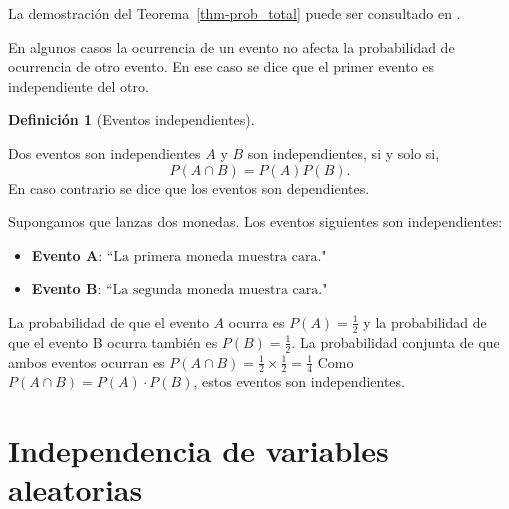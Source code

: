 \documentclass[
  us-letterpaper,
]{scrreprt}
\theoremstyle{plain}
\theoremstyle{plain}
\theoremstyle{definition}
\newtheorem{definition}{Definición}[chapter]
\theoremstyle{remark}
\begin{document}
La demostración del Teorema~\ref{thm-prob_total} puede ser consultado en
\autocite{castaneda2012introduction}.

En algunos casos la ocurrencia de un evento no afecta la probabilidad de
ocurrencia de otro evento. En ese caso se dice que el primer evento es
independiente del otro.

\begin{definition}[Eventos
independientes]\protect\hypertarget{def-even_ind}{}\label{def-even_ind}

Dos eventos son independientes \(A\) y \(B\) son independientes, si y
solo si, \[P(A \cap B) = P(A)P(B).\]En caso contrario se dice que los
eventos son dependientes.

\end{definition}

\begin{tcolorbox}[enhanced jigsaw, titlerule=0mm, opacityback=0, coltitle=black, bottomrule=.15mm, colbacktitle=quarto-callout-caution-color!10!white, toprule=.15mm, colback=white, arc=.35mm, colframe=quarto-callout-caution-color-frame, leftrule=.75mm, bottomtitle=1mm, left=2mm, toptitle=1mm, opacitybacktitle=0.6, breakable, title={Ejemplo (\textbf{\emph{Ejemplo de eventos independientes}})}, rightrule=.15mm]

Supongamos que lanzas dos monedas. Los eventos siguientes son
independientes:

\begin{itemize}
\item
  \textbf{Evento A}: \(\text{``La primera moneda muestra cara."}\)
\item
  \textbf{Evento B}: \(\text{``La segunda moneda muestra cara."}\)
\end{itemize}

La probabilidad de que el evento \(A\) ocurra es
\(P(A) = \frac{1}{2}\)\hspace{0pt} y la probabilidad de que el evento B
ocurra también es \(P(B) = \frac{1}{2}\)\hspace{0pt}. La probabilidad
conjunta de que ambos eventos ocurran es
\(P(A \cap B) = \frac{1}{2} \times \frac{1}{2} = \frac{1}{4}\) Como
\(P(A \cap B) = P(A) \cdot P(B)\), estos eventos son independientes.

\end{tcolorbox}

\section{Independencia de variables
aleatorias}\label{independencia-de-variables-aleatorias}
\end{document}
